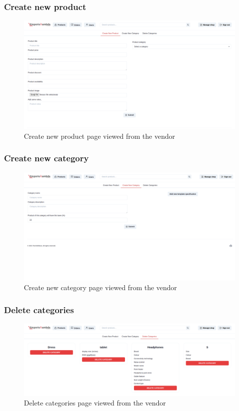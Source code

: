 \subsubsection{Create new product}
\begin{figure}[!ht]
    \caption{Create new product page viewed from the vendor}
    \vspace{5px}
    \includegraphics[scale=0.25]{../../../../Images/userManual/createNewProductVendor.png}
    \centering
\end{figure}
\pagebreak
\subsubsection{Create new category}
\begin{figure}[!ht]
    \caption{Create new category page viewed from the vendor}
    \vspace{5px}
    \includegraphics[scale=0.25]{../../../../Images/userManual/createNewCategoryVendor.png}
    \centering
\end{figure}
\pagebreak
\subsubsection{Delete categories}
\begin{figure}[!ht]
    \caption{Delete categories page viewed from the vendor}
    \vspace{5px}
    \includegraphics[scale=0.25]{../../../../Images/userManual/deleteCategoriesVendor.png}
    \centering
\end{figure}